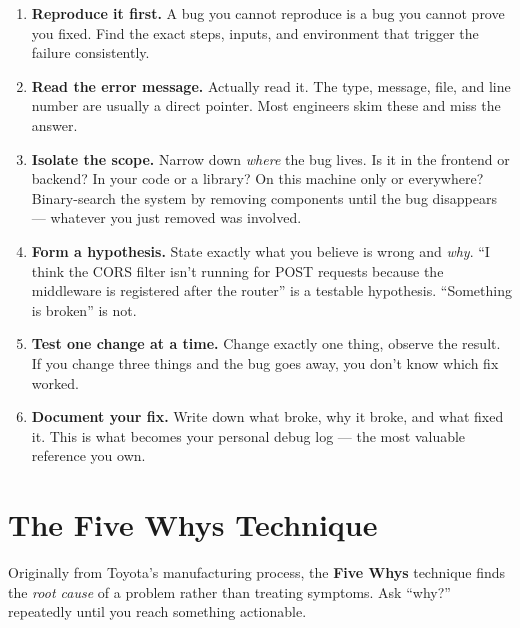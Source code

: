 \documentclass[11pt, letterpaper]{article}
\begin{document}
\begin{tcolorbox}[colback=part3bg, colframe=sectionpurple,
  title={\bfseries The 6-Step Debugging Loop}, arc=3pt, boxrule=1pt]
\begin{enumerate}[leftmargin=*, noitemsep]
  \item \textbf{Reproduce it first.} A bug you cannot reproduce is a bug you cannot prove you fixed. Find the exact steps, inputs, and environment that trigger the failure consistently.
  \item \textbf{Read the error message.} Actually read it. The type, message, file, and line number are usually a direct pointer. Most engineers skim these and miss the answer.
  \item \textbf{Isolate the scope.} Narrow down \emph{where} the bug lives. Is it in the frontend or backend? In your code or a library? On this machine only or everywhere? Binary-search the system by removing components until the bug disappears --- whatever you just removed was involved.
  \item \textbf{Form a hypothesis.} State exactly what you believe is wrong and \emph{why}. ``I think the CORS filter isn't running for POST requests because the middleware is registered after the router'' is a testable hypothesis. ``Something is broken'' is not.
  \item \textbf{Test one change at a time.} Change exactly one thing, observe the result. If you change three things and the bug goes away, you don't know which fix worked.
  \item \textbf{Document your fix.} Write down what broke, why it broke, and what fixed it. This is what becomes your personal debug log --- the most valuable reference you own.
\end{enumerate}
\end{tcolorbox}

\section*{The Five Whys Technique}

Originally from Toyota's manufacturing process, the \textbf{Five Whys} technique finds the \emph{root cause} of a problem rather than treating symptoms. Ask ``why?'' repeatedly until you reach something actionable.
\end{document}
